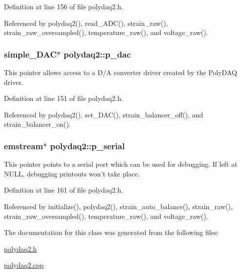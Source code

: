 Definition at line 156 of file polydaq2.\-h.



Referenced by polydaq2(), read\-\_\-\-A\-D\-C(), strain\-\_\-raw(), strain\-\_\-raw\-\_\-oversampled(), temperature\-\_\-raw(), and voltage\-\_\-raw().

\hypertarget{classpolydaq2_a073eef7409f849444cecfdfd862be831}{
\subsubsection[{p\-\_\-dac}]{\setlength{\rightskip}{0pt plus 5cm}simple\-\_\-\-D\-A\-C$\ast$ polydaq2\-::p\-\_\-dac\hspace{0.3cm}{\ttfamily [protected]}}}\label{classpolydaq2_a073eef7409f849444cecfdfd862be831}
This pointer allows access to a D/\-A converter driver created by the Poly\-D\-A\-Q driver. 

Definition at line 151 of file polydaq2.\-h.



Referenced by polydaq2(), set\-\_\-\-D\-A\-C(), strain\-\_\-balancer\-\_\-off(), and strain\-\_\-balancer\-\_\-on().

\hypertarget{classpolydaq2_a08c9b43abd6589c0981eddd3d8a87ba9}{
\subsubsection[{p\-\_\-serial}]{\setlength{\rightskip}{0pt plus 5cm}emstream$\ast$ polydaq2\-::p\-\_\-serial\hspace{0.3cm}{\ttfamily [protected]}}}\label{classpolydaq2_a08c9b43abd6589c0981eddd3d8a87ba9}
This pointer points to a serial port which can be used for debugging. If left at {\ttfamily N\-U\-L\-L}, debugging printouts won't take place. 

Definition at line 161 of file polydaq2.\-h.



Referenced by initialize(), polydaq2(), strain\-\_\-auto\-\_\-balance(), strain\-\_\-raw(), strain\-\_\-raw\-\_\-oversampled(), temperature\-\_\-raw(), and voltage\-\_\-raw().



The documentation for this class was generated from the following files\-:\begin{DoxyCompactItemize}
\item 
\hyperlink{polydaq2_8h}{polydaq2.\-h}\item 
\hyperlink{polydaq2_8cpp}{polydaq2.\-cpp}\end{DoxyCompactItemize}
